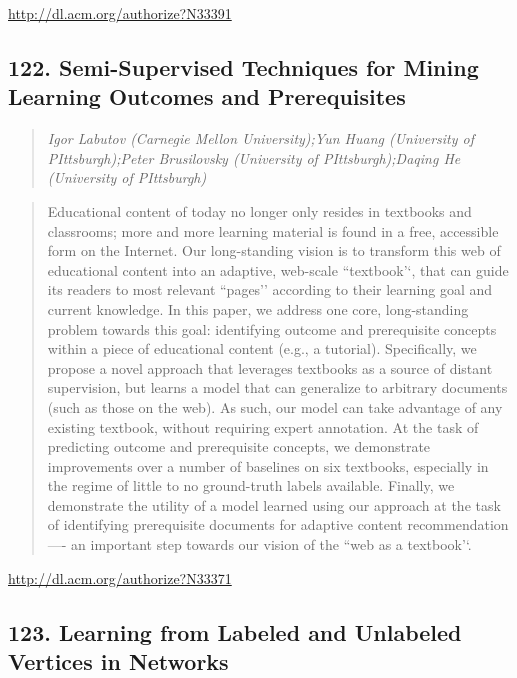 \documentclass{article}
\begin{document}
\href{http://dl.acm.org/authorize?N33391}{http://dl.acm.org/authorize?N33391}

\subsection{122. Semi-Supervised Techniques for Mining Learning Outcomes and Prerequisites}

\begin{quote}
\footnotesize{\textit{Igor Labutov (Carnegie Mellon University);Yun Huang (University of PIttsburgh);Peter Brusilovsky (University of PIttsburgh);Daqing He (University of PIttsburgh)}}

\end{quote}

\begin{quote}
Educational content of today no longer only resides in textbooks and classrooms; more and more learning material is found in a free, accessible form on the Internet. Our long-standing vision is to transform this web of educational content into an adaptive, web-scale ``textbook’‘, that can guide its readers to most relevant ``pages’’ according to their learning goal and current knowledge. In this paper, we address one core, long-standing problem towards this goal: identifying outcome and prerequisite concepts within a piece of educational content (e.g., a tutorial). Specifically, we propose a novel approach that leverages textbooks as a source of distant supervision, but learns a model that can generalize to arbitrary documents (such as those on the web). As such, our model can take advantage of any existing textbook, without requiring expert annotation. At the task of predicting outcome and prerequisite concepts, we demonstrate improvements over a number of baselines on six textbooks, especially in the regime of little to no ground-truth labels available. Finally, we demonstrate the utility of a model learned using our approach at the task of identifying prerequisite documents for adaptive content recommendation—- an important step towards our vision of the ``web as a textbook’‘.
\end{quote}

\href{http://dl.acm.org/authorize?N33371}{http://dl.acm.org/authorize?N33371}

\subsection{123. Learning from Labeled and Unlabeled Vertices in Networks}
\end{document}
